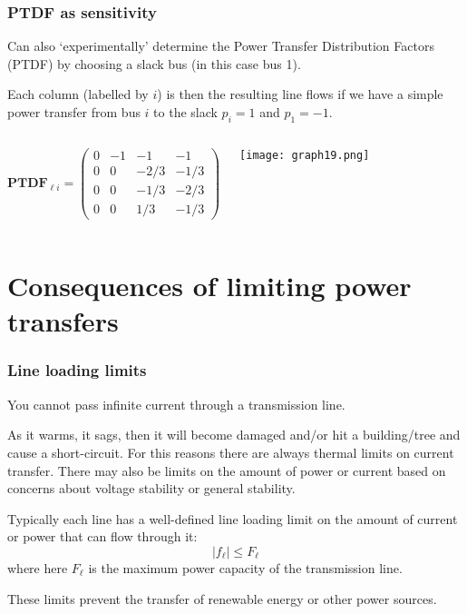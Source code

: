 \documentclass[10pt,dvipsnames]{beamer}
\begin{document}
\begin{frame}
  \frametitle{PTDF as sensitivity}

  Can also `experimentally' determine the Power Transfer Distribution
  Factors (PTDF) by choosing a slack bus (in this case bus 1).

  Each column (labelled by $i$) is then the resulting line flows if we have
  a simple power transfer from bus $i$ to the slack $p_i = 1$ and $p_1
  = -1$.

  \begin{columns}
\begin{equation*}
\mathbf{PTDF}_{\ell i}=\left(\begin{matrix}
0 & -1 & -1 & -1\\
0 & 0 & -2/3 & -1/3\\
0 & 0 & -1/3 & -2/3\\
0 & 0 & 1/3 & -1/3
\end{matrix}\right)
\end{equation*}

\texttt{[image: graph19.png]}
\end{columns}


\end{frame}
\section{Consequences of limiting power transfers}


\begin{frame}
  \frametitle{Line loading limits}

  You cannot pass infinite current through a transmission line.

  As it warms, it sags, then it will become damaged and/or hit a
  building/tree and cause a short-circuit. For this reasons there are
  always \alert{thermal limits} on current transfer. There may also be
  limits on the amount of power or current based on concerns about
  \alert{voltage stability} or \alert{general stability}.

  Typically each line has a well-defined \alert{line loading limit} on the
  amount of current or power that can flow through it:
  \begin{equation*}
    | f_{\ell } | \leq F_\ell
  \end{equation*}
  where here $F_\ell$ is the maximum power capacity of the transmission line.

  These limits prevent the transfer of renewable energy or other power sources.

\end{frame}
\end{document}
